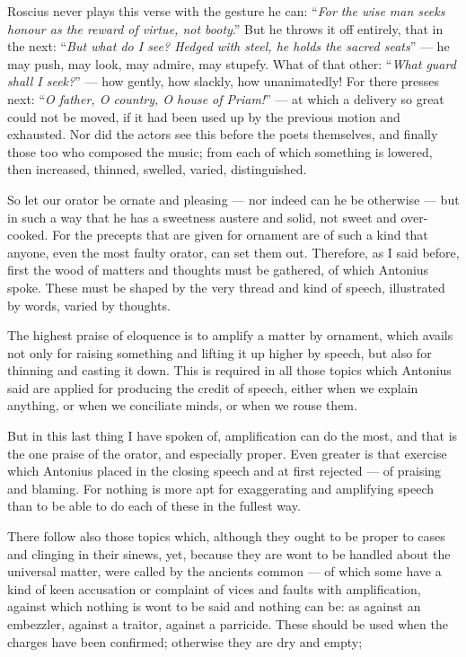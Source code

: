  Roscius never plays this verse with the gesture he can: ``\textit{For the wise man seeks honour as the reward of virtue, not booty}.'' But he throws it off entirely, that in the next: ``\textit{But what do I see? Hedged with steel, he holds the sacred seats}'' — he may push, may look, may admire, may stupefy. What of that other: ``\textit{What guard shall I seek?}'' — how gently, how slackly, how unanimatedly! For there presses next: ``\textit{O father, O country, O house of Priam!}'' — at which a delivery so great could not be moved, if it had been used up by the previous motion and exhausted. Nor did the actors see this before the poets themselves, and finally those too who composed the music; from each of which something is lowered, then increased, thinned, swelled, varied, distinguished.

 So let our orator be ornate and pleasing — nor indeed can he be otherwise — but in such a way that he has a sweetness austere and solid, not sweet and over-cooked. For the precepts that are given for ornament are of such a kind that anyone, even the most faulty orator, can set them out. Therefore, as I said before, first the wood of matters and thoughts must be gathered, of which Antonius spoke. These must be shaped by the very thread and kind of speech, illustrated by words, varied by thoughts.

 The highest praise of eloquence is to amplify a matter by ornament, which avails not only for raising something and lifting it up higher by speech, but also for thinning and casting it down. This is required in all those topics which Antonius said are applied for producing the credit of speech, either when we explain anything, or when we conciliate minds, or when we rouse them.

 But in this last thing I have spoken of, amplification can do the most, and that is the one praise of the orator, and especially proper. Even greater is that exercise which Antonius placed in the closing speech and at first rejected — of praising and blaming. For nothing is more apt for exaggerating and amplifying speech than to be able to do each of these in the fullest way.

 There follow also those topics which, although they ought to be proper to cases and clinging in their sinews, yet, because they are wont to be handled about the universal matter, were called by the ancients common — of which some have a kind of keen accusation or complaint of vices and faults with amplification, against which nothing is wont to be said and nothing can be: as against an embezzler, against a traitor, against a parricide. These should be used when the charges have been confirmed; otherwise they are dry and empty;

